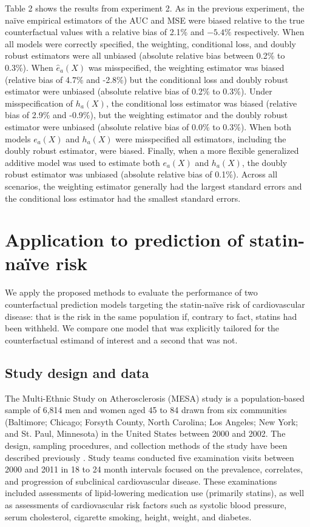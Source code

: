 Table 2 shows the results from experiment 2. As in the previous experiment, the na\"{i}ve empirical estimators of the AUC and MSE were biased relative to the true counterfactual values with a relative bias of 2.1\% and $-5.4\%$ respectively. When all models were correctly specified, the weighting, conditional loss, and doubly robust estimators were all unbiased (absolute relative bias between 0.2\% to 0.3\%). When $\widehat e_a(X)$ was misspecified, the weighting estimator was biased (relative bias of 4.7\% and -2.8\%) but the conditional loss and doubly robust estimator were unbiased (absolute relative bias of 0.2\% to 0.3\%). Under misspecification of $h_a(X)$, the conditional loss estimator was biased (relative bias of 2.9\% and -0.9\%), but the weighting estimator and the doubly robust estimator were unbiased (absolute relative bias of 0.0\% to 0.3\%). When both models $e_a(X)$ and $h_a(X)$ were misspecified all estimators, including the doubly robust estimator, were biased. Finally, when a more flexible generalized additive model was used to estimate both $e_a(X)$ and $h_a(X)$, the doubly robust estimator was unbiased (absolute relative bias of 0.1\%). Across all scenarios, the weighting estimator generally had the largest standard errors and the conditional loss estimator had the smallest standard errors.




\section{Application to prediction of statin-na\"{i}ve risk} \label{sec:results}

We apply the proposed methods to evaluate the performance of two counterfactual prediction models targeting the statin-na\"{i}ve risk of cardiovascular disease: that is the risk in the same population if, contrary to fact, statins had been withheld. We compare one model that was explicitly tailored for the counterfactual estimand of interest and a second that was not. 

\subsection{Study design and data}
The Multi-Ethnic Study on Atherosclerosis (MESA) study is a population-based sample of 6,814 men and women aged 45 to 84 drawn from six communities (Baltimore; Chicago; Forsyth County, North Carolina; Los Angeles; New York; and St. Paul, Minnesota) in the United States between 2000 and 2002. The design, sampling procedures, and collection methods of the study have been described previously \cite{bild_multi-ethnic_2002}. Study teams conducted five examination visits between 2000 and 2011 in 18 to 24 month intervals focused on the prevalence, correlates, and progression of subclinical cardiovascular disease. These examinations included assessments of lipid-lowering medication use (primarily statins), as well as assessments of cardiovascular risk factors such as systolic blood pressure, serum cholesterol, cigarette smoking, height, weight, and diabetes. 

